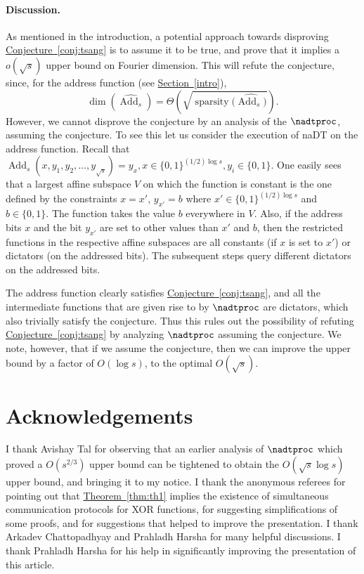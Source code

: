\documentclass[11pt]{article}
\numberwithin{equation}{section}
\theoremstyle{definition}
\theoremstyle{plain}
\DeclareMathOperator{\spa}{sparsity}
\DeclareMathOperator{\dimn}{dim}
\DeclareMathOperator{\Add}{Add}   %
\newcommand{\lref}[2][]{\hyperref[#2]{#1~\ref*{#2}}}
\begin{document}
\paragraph{Discussion.}  %
As mentioned in the introduction, a potential approach towards disproving \lref[Conjecture]{conj:tsang} is to assume it to be true, and prove that it implies a $o(\sqrt{s})$ upper bound on Fourier dimension.
This will refute the conjecture, since, for the address function (see \lref[Section]{intro}),
\[
  \dimn(\widehat{\Add_s}) = \Theta\left(\sqrt{\spa(\widehat{\Add_s)}}\right).
\]
However, we cannot disprove the conjecture by an analysis of the
$\nadtproc$, assuming the conjecture. To see this let us consider the
execution of {\sc naDT} on the address function. Recall that
$\Add_s(x,y_1,y_2,\dots,y_{\sqrt{s}}) = y_x, x \in\{0,1\}^{(1/2)\log
  s}, y_i \in \{0,1\}$. One easily sees that a largest affine subspace
$V$ on which the function is constant is the one defined by the
constraints $x=x'$, $y_{x'}=b$ where
$x' \in \{0,1\}^{({1}/{2}) \log s}$ and $b \in \{0,1\}$. The
function takes the value $b$ everywhere in $V$. Also, if the
%
address     %
bits $x$ and the bit $y_{x'}$ are set to other values than $x'$ and $b$,
then the restricted functions in the respective affine subspaces are all
constants (if $x$ is set to $x'$) or dictators (on
%
the addressed  %
bits). The subsequent steps
%
query  %
different dictators on the
%
addressed   %
bits.

The address function clearly satisfies \lref[Conjecture]{conj:tsang}, and all the intermediate functions that are given rise to by $\nadtproc$ are dictators, which also trivially satisfy the conjecture.
Thus this rules out the possibility of refuting \lref[Conjecture]{conj:tsang} by analyzing $\nadtproc$ assuming the conjecture. We note, however, that if we assume the conjecture, then we
can improve the upper bound by a factor of $O(\log s)$, to the optimal $O(\sqrt{s})$.
\section*{Acknowledgements}
I thank Avishay Tal for observing that an earlier analysis of $\nadtproc$ which proved a $O(s^{2/3})$ upper bound can be tightened to obtain the $O(\sqrt{s} \log s)$ upper bound, and bringing it to my notice. I thank the anonymous referees for pointing out that \lref[Theorem]{thm:th1} implies
the  %
existence of simultaneous communication protocols for XOR functions, for suggesting simplifications of some proofs, and for suggestions that helped to %
improve the presentation. I thank Arkadev Chattopadhyay and Prahladh Harsha for many helpful discussions. I thank Prahladh Harsha for his help in
%
significantly improving the presentation of this article.  %
\end{document}
